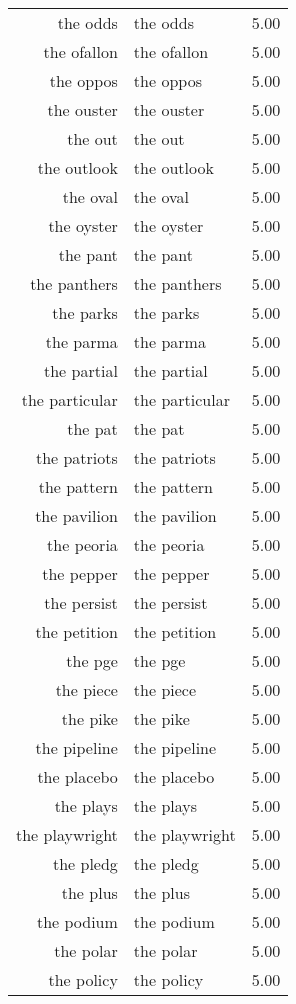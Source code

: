 \begin{table}[ht]
\begin{tabular}{rlr}
  the odds & the odds & 5.00 \\ 
  the ofallon & the ofallon & 5.00 \\ 
  the oppos & the oppos & 5.00 \\ 
  the ouster & the ouster & 5.00 \\ 
  the out & the out & 5.00 \\ 
  the outlook & the outlook & 5.00 \\ 
  the oval & the oval & 5.00 \\ 
  the oyster & the oyster & 5.00 \\ 
  the pant & the pant & 5.00 \\ 
  the panthers & the panthers & 5.00 \\ 
  the parks & the parks & 5.00 \\ 
  the parma & the parma & 5.00 \\ 
  the partial & the partial & 5.00 \\ 
  the particular & the particular & 5.00 \\ 
  the pat & the pat & 5.00 \\ 
  the patriots & the patriots & 5.00 \\ 
  the pattern & the pattern & 5.00 \\ 
  the pavilion & the pavilion & 5.00 \\ 
  the peoria & the peoria & 5.00 \\ 
  the pepper & the pepper & 5.00 \\ 
  the persist & the persist & 5.00 \\ 
  the petition & the petition & 5.00 \\ 
  the pge & the pge & 5.00 \\ 
  the piece & the piece & 5.00 \\ 
  the pike & the pike & 5.00 \\ 
  the pipeline & the pipeline & 5.00 \\ 
  the placebo & the placebo & 5.00 \\ 
  the plays & the plays & 5.00 \\ 
  the playwright & the playwright & 5.00 \\ 
  the pledg & the pledg & 5.00 \\ 
  the plus & the plus & 5.00 \\ 
  the podium & the podium & 5.00 \\ 
  the polar & the polar & 5.00 \\ 
  the policy & the policy & 5.00 \\ 

\end{tabular}
\end{table}
